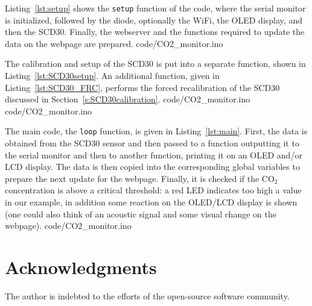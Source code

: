 \documentclass[12pt,a4paper]{article}
\newcommand{\coo}{\ensuremath{\mathrm{CO_2}~}}
\begin{document}
Listing~\ref{lst:setup} shows the \texttt{setup} function of the code, where the serial monitor is initialized, followed by the diode, optionally the WiFi, the OLED display, and then the SCD30. Finally, the webserver and the functions required to update the data on the webpage are prepared.
%
{code/CO2_monitor.ino}

The calibration and setup of the SCD30 is put into a separate function, shown in Listing~\ref{lst:SCD30setup}. An additional function, given in Listing~\ref{lst:SCD30_FRC}, performs the forced recalibration of the SCD30 discussed in Section~\ref{s:SCD30calibration}.
%
{code/CO2_monitor.ino}
%
{code/CO2_monitor.ino}

The main code, the \texttt{loop} function, is given in Listing~\ref{lst:main}. First, the data is obtained from the SCD30 sensor and then passed to a function outputting it to the serial monitor and then to another function, printing it on an OLED and/or LCD display. The data is then copied into the corresponding global variables to prepare the next update for the webpage. Finally, it is checked if the \coo concentration is above a critical threshold: a red LED indicates too high a value in our example, in addition some reaction on the OLED/LCD display is shown (one could also think of an acoustic signal and some visual change on the webpage).
%
{code/CO2_monitor.ino} 


\section*{Acknowledgments}
The author is indebted to the efforts of the open-source software community.



\end{document}
